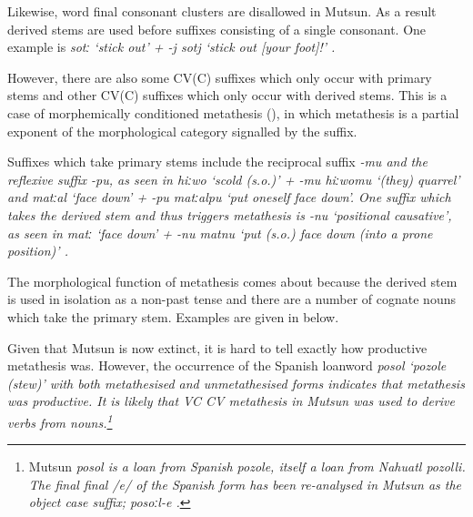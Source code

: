 Likewise, word final consonant clusters are disallowed in Mutsun.
As a result derived stems are used before suffixes consisting of a single consonant.
One example is \it{sotː} `stick out' + \it{-j} 
{\ra} \it{sotj} `stick out [your foot]!' \citep[125]{ok79}.

However, there are also some CV(C) suffixes which only occur with primary stems
and other CV(C) suffixes which only occur with derived stems.
This is a case of morphemically conditioned metathesis (),
in which metathesis is a partial exponent of the morphological
category signalled by the suffix.

Suffixes which take primary stems include the reciprocal suffix \it{-mu}
and the reflexive suffix \it{-pu},
as seen in \it{hiːwo} `scold (s.o.)' + \it{-mu}  {\ra} \it{hiːwomu} `(they) quarrel' 
and \it{matːal} `face down' + \it{-pu}  {\ra} \it{matːalpu} `put oneself face down'.
One suffix which takes the derived stem and thus triggers metathesis is \it{-nu} `positional causative',
as seen in \it{matː} `face down' + \it{-nu} {\ra} \it{matnu}
`put (s.o.) face down (into a prone position)' \citep[126]{ok79}.

The morphological function of metathesis comes about because the derived stem
is used in isolation as a non-past tense
and there are a number of cognate nouns
which take the primary stem.
Examples are given in  below.

\begin{exe}
	\label{ex:MutDerMet}
\end{exe}

Given that Mutsun is now extinct, it is hard to tell exactly how productive metathesis was.
However, the occurrence of the Spanish loanword \it{posol} `pozole (stew)'
with both metathesised  and unmetathesised forms indicates that metathesis was productive.
It is likely that VC {\ra} CV metathesis in Mutsun was used to derive verbs from nouns.\footnote{
		Mutsun \it{posol} is a loan from Spanish \it{pozole}, itself a loan from Nahuatl \it{pozolli}.
		The final final /e/ of the Spanish form has been re-analysed in Mutsun as 
		the object case suffix; \it{posoːl-e} \citep[127, fn.14]{ok77}.}

